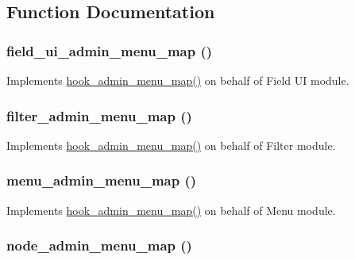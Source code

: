 \subsection{Function Documentation}
\hypertarget{admin__menu_8map_8inc_a4641b75b26fd20d33c541e0b50b7cca9}{
\subsubsection[{field\_\-ui\_\-admin\_\-menu\_\-map}]{\setlength{\rightskip}{0pt plus 5cm}field\_\-ui\_\-admin\_\-menu\_\-map ()}}
\label{admin__menu_8map_8inc_a4641b75b26fd20d33c541e0b50b7cca9}
Implements \hyperlink{admin__menu_8api_8php_a4b3f2235db483f670a2e7327633868df}{hook\_\-admin\_\-menu\_\-map()} on behalf of Field UI module. \hypertarget{admin__menu_8map_8inc_ad1c4e40dd26113df9b8ae87691ada8ae}{
\subsubsection[{filter\_\-admin\_\-menu\_\-map}]{\setlength{\rightskip}{0pt plus 5cm}filter\_\-admin\_\-menu\_\-map ()}}
\label{admin__menu_8map_8inc_ad1c4e40dd26113df9b8ae87691ada8ae}
Implements \hyperlink{admin__menu_8api_8php_a4b3f2235db483f670a2e7327633868df}{hook\_\-admin\_\-menu\_\-map()} on behalf of Filter module. \hypertarget{admin__menu_8map_8inc_afb91fc5bbb65b06defebf57feae92cd7}{
\subsubsection[{menu\_\-admin\_\-menu\_\-map}]{\setlength{\rightskip}{0pt plus 5cm}menu\_\-admin\_\-menu\_\-map ()}}
\label{admin__menu_8map_8inc_afb91fc5bbb65b06defebf57feae92cd7}
Implements \hyperlink{admin__menu_8api_8php_a4b3f2235db483f670a2e7327633868df}{hook\_\-admin\_\-menu\_\-map()} on behalf of Menu module. \hypertarget{admin__menu_8map_8inc_a645da462c9f34a48bdfc0d76c47c1d8d}{
\subsubsection[{node\_\-admin\_\-menu\_\-map}]{\setlength{\rightskip}{0pt plus 5cm}node\_\-admin\_\-menu\_\-map ()}}
